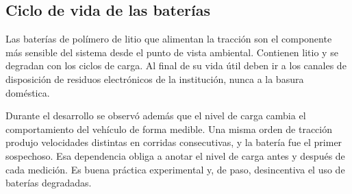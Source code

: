 \subsection{Ciclo de vida de las baterías}

Las baterías de polímero de litio que alimentan la tracción son el componente más
sensible del sistema desde el punto de vista ambiental. Contienen litio y se
degradan con los ciclos de carga. Al final de su vida útil deben ir a los canales
de disposición de residuos electrónicos de la institución, nunca a la basura
doméstica.


Durante el desarrollo se observó además que el nivel de carga cambia el
comportamiento del vehículo de forma medible. Una misma orden de tracción produjo
velocidades distintas en corridas consecutivas, y la batería fue el primer
sospechoso. Esa dependencia obliga a anotar el nivel de carga antes y después de
cada medición. Es buena práctica experimental y, de paso, desincentiva el uso de
baterías degradadas.
